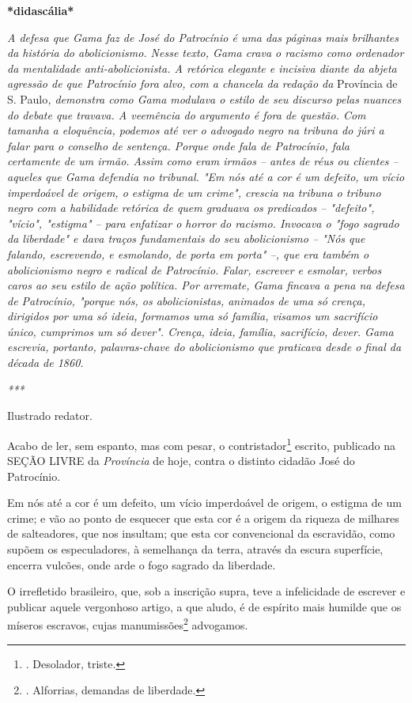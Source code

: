 \textbf{*didascália*}

\emph{A defesa que Gama faz de José do Patrocínio é uma das páginas mais
brilhantes da história do abolicionismo. Nesse texto, Gama crava o
racismo como ordenador da mentalidade anti-abolicionista. A retórica
elegante e incisiva diante da abjeta agressão de que Patrocínio fora
alvo, com a chancela da redação da} Província de S. Paulo\emph{,
demonstra como Gama modulava o estilo de seu discurso pelas nuances do
debate que travava. A veemência do argumento é fora de questão. Com
tamanha a eloquência, podemos até ver o advogado negro na tribuna do
júri a falar para o conselho de sentença. Porque onde fala de
Patrocínio, fala certamente de um irmão. Assim como eram irmãos -- antes
de réus ou clientes -- aqueles que Gama defendia no tribunal. "Em nós
até a cor é um defeito, um vício imperdoável de origem, o estigma de um
crime", crescia na tribuna o tribuno negro com a habilidade retórica de
quem graduava os predicados -- "defeito", "vício", "estigma" -- para
enfatizar o horror do racismo. Invocava o "fogo sagrado da liberdade" e
dava traços fundamentais do seu abolicionismo -- "Nós que falando,
escrevendo, e esmolando, de porta em porta" --, que era também o
abolicionismo negro e radical de Patrocínio. Falar, escrever e esmolar,
verbos caros ao seu estilo de ação política. Por arremate, Gama fincava
a pena na defesa de Patrocínio, "porque nós, os abolicionistas, animados
de uma só crença, dirigidos por uma só ideia, formamos uma só família,
visamos um sacrifício único, cumprimos um só dever". Crença, ideia,
família, sacrifício, dever. Gama escrevia, portanto, palavras-chave do
abolicionismo que praticava desde o final da década de 1860. }

\emph{***}

Ilustrado redator.

Acabo de ler, sem espanto, mas com pesar, o contristador\footnote{.
  Desolador, triste.} escrito, publicado na SEÇÃO LIVRE da
\emph{Província} de hoje, contra o distinto cidadão José do Patrocínio.

Em nós até a cor é um defeito, um vício imperdoável de origem, o estigma
de um crime; e vão ao ponto de esquecer que esta cor é a origem da
riqueza de milhares de salteadores, que nos insultam; que esta cor
convencional da escravidão, como supõem os especuladores, à semelhança
da terra, através da escura superfície, encerra vulcões, onde arde o
fogo sagrado da liberdade.

O irrefletido brasileiro, que, sob a inscrição supra, teve a
infelicidade de escrever e publicar aquele vergonhoso artigo, a que
aludo, é de espírito mais humilde que os míseros escravos, cujas
manumissões\footnote{. Alforrias, demandas de liberdade.} advogamos.

